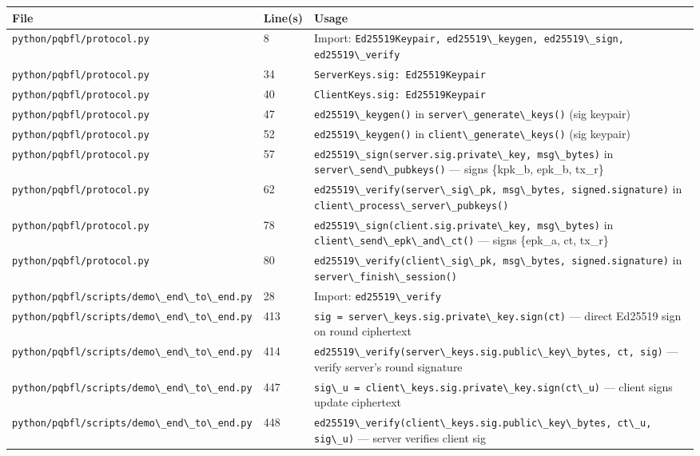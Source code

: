 \documentclass[11pt,a4paper]{article}
\newcommand{\code}[1]{\lstinline[basicstyle=\ttfamily\small]!#1!}
\begin{document}
\begin{longtable}{L{5.5cm} L{1.8cm} L{7cm}}
\toprule
\textbf{File} & \textbf{Line(s)} & \textbf{Usage} \\
\midrule
\endhead
\bottomrule
\endfoot
\code{python/pqbfl/protocol.py}              & 8       & Import: \code{Ed25519Keypair, ed25519\_keygen, ed25519\_sign, ed25519\_verify} \\
\code{python/pqbfl/protocol.py}              & 34      & \code{ServerKeys.sig: Ed25519Keypair} \\
\code{python/pqbfl/protocol.py}              & 40      & \code{ClientKeys.sig: Ed25519Keypair} \\
\code{python/pqbfl/protocol.py}              & 47      & \code{ed25519\_keygen()} in \code{server\_generate\_keys()} (sig keypair) \\
\code{python/pqbfl/protocol.py}              & 52      & \code{ed25519\_keygen()} in \code{client\_generate\_keys()} (sig keypair) \\
\code{python/pqbfl/protocol.py}              & 57      & \code{ed25519\_sign(server.sig.private\_key, msg\_bytes)} in \code{server\_send\_pubkeys()} --- signs \{kpk\_b, epk\_b, tx\_r\} \\
\code{python/pqbfl/protocol.py}              & 62      & \code{ed25519\_verify(server\_sig\_pk, msg\_bytes, signed.signature)} in \code{client\_process\_server\_pubkeys()} \\
\code{python/pqbfl/protocol.py}              & 78      & \code{ed25519\_sign(client.sig.private\_key, msg\_bytes)} in \code{client\_send\_epk\_and\_ct()} --- signs \{epk\_a, ct, tx\_r\} \\
\code{python/pqbfl/protocol.py}              & 80      & \code{ed25519\_verify(client\_sig\_pk, msg\_bytes, signed.signature)} in \code{server\_finish\_session()} \\
\code{python/pqbfl/scripts/demo\_end\_to\_end.py} & 28      & Import: \code{ed25519\_verify} \\
\code{python/pqbfl/scripts/demo\_end\_to\_end.py} & 413     & \code{sig = server\_keys.sig.private\_key.sign(ct)} --- direct Ed25519 sign on round ciphertext \\
\code{python/pqbfl/scripts/demo\_end\_to\_end.py} & 414     & \code{ed25519\_verify(server\_keys.sig.public\_key\_bytes, ct, sig)} --- verify server's round signature \\
\code{python/pqbfl/scripts/demo\_end\_to\_end.py} & 447     & \code{sig\_u = client\_keys.sig.private\_key.sign(ct\_u)} --- client signs update ciphertext \\
\code{python/pqbfl/scripts/demo\_end\_to\_end.py} & 448     & \code{ed25519\_verify(client\_keys.sig.public\_key\_bytes, ct\_u, sig\_u)} --- server verifies client sig \\
\end{longtable}
\end{document}
